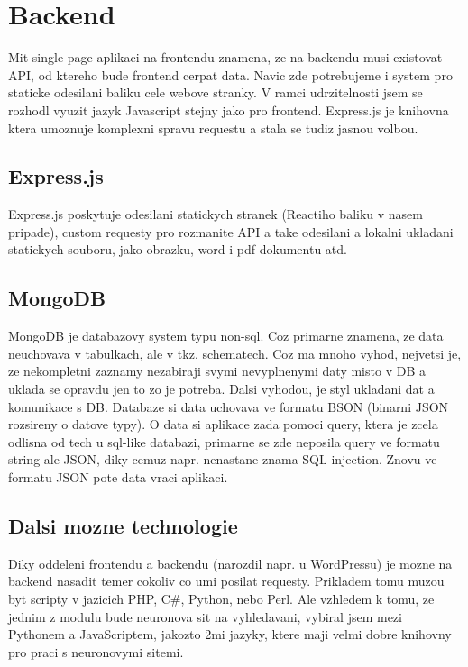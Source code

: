 \section{Backend}
Mit single page aplikaci na frontendu znamena, ze na backendu musi existovat API,
od ktereho bude frontend cerpat data.
Navic zde potrebujeme i system pro staticke odesilani baliku cele webove stranky.
V ramci udrzitelnosti jsem se rozhodl vyuzit jazyk Javascript stejny jako pro frontend.
Express.js je knihovna ktera umoznuje komplexni spravu requestu a
stala se tudiz jasnou volbou.

\subsection{Express.js}
Express.js poskytuje odesilani statickych stranek (Reactiho baliku v nasem pripade),
custom requesty pro rozmanite API a take odesilani a lokalni ukladani statickych souboru,
jako obrazku, word i pdf dokumentu atd.

\subsection{MongoDB}
MongoDB je databazovy system typu non-sql.
Coz primarne znamena, ze data neuchovava v tabulkach, ale v tkz. schematech.
Coz ma mnoho vyhod, nejvetsi je, ze nekompletni zaznamy nezabiraji
svymi nevyplnenymi daty misto v DB a uklada se opravdu jen to zo je potreba.
Dalsi vyhodou, je styl ukladani dat a komunikace s DB.
Databaze si data uchovava ve formatu BSON (binarni JSON rozsireny o datove typy).
O data si aplikace zada pomoci query,
ktera je zcela odlisna od tech u sql-like databazi,
primarne se zde neposila query ve formatu string ale JSON,
diky cemuz napr. nenastane znama SQL injection.
Znovu ve formatu JSON pote data vraci aplikaci.

\subsection{Dalsi mozne technologie}
Diky oddeleni frontendu a backendu (narozdil napr. u WordPressu) je mozne
na backend nasadit temer cokoliv co umi posilat requesty.
Prikladem tomu muzou byt scripty v jazicich PHP, C\#, Python, nebo Perl.
Ale vzhledem k tomu, ze jednim z modulu bude neuronova sit na vyhledavani,
vybiral jsem mezi Pythonem a JavaScriptem, jakozto 2mi jazyky, ktere
maji velmi dobre knihovny pro praci s neuronovymi sitemi.


